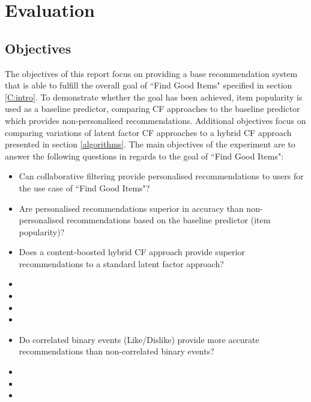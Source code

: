 \chapter{Evaluation}\label{C:evaluation}

\section{Objectives}

The objectives of this report focus on providing a base recommendation system that is able to fulfill the overall goal of ``Find Good Items" specified in section \ref{C:intro}. To demonstrate whether the goal has been achieved, item popularity is used as a baseline predictor, comparing CF approaches to the baseline predictor which provides non-personalised recommendations. Additional objectives focus on comparing variations of latent factor CF approaches to a hybrid CF approach presented in section \ref{algorithms}. The main objectives of the experiment are to answer the following questions in regards to the goal of ``Find Good Items":

\begin{itemize}
	\item{Can collaborative filtering provide personalised recommendations to users for the use case of ``Find Good Items"?}
	\item{Are personalised recommendations superior in accuracy than non-personalised recommendations based on the baseline predictor (item popularity)?}
	\item{Does a content-boosted hybrid CF approach provide superior recommendations to a standard latent factor approach?}
	\item{}
	\item{}
	\item{}
	\item{}
	\item{Do correlated binary events (Like/Dislike) provide more accurate recommendations than non-correlated binary events?}
	\item{}
	\item{}
	\item{}
\end{itemize}


